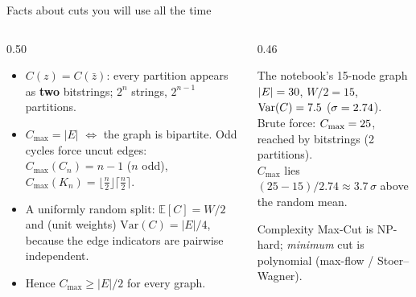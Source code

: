 \documentclass[aspectratio=169,11pt]{beamer}
\newcommand{\key}[1]{{\color{qdark}\textbf{#1}}}
\begin{document}
\begin{frame}{Facts about cuts you will use all the time}
  \begin{columns}[T]
    \begin{column}{0.50\textwidth}
      \begin{itemize}
        \item $C(z) = C(\bar z)$: every partition appears as \key{two} bitstrings; $2^n$ strings, $2^{n-1}$ partitions.
        \item $C_{\max} = |E|$ $\iff$ the graph is bipartite. Odd cycles force uncut edges:\\
          $C_{\max}(C_n) = n - 1$ ($n$ odd), $C_{\max}(K_n) = \lfloor\frac n2\rfloor\lceil\frac n2\rceil$.
        \item A uniformly random split: $\mathbb E[C] = W/2$ and (unit weights) $\mathrm{Var}(C) = |E|/4$, because
          the edge indicators are pairwise independent.
        \item Hence $C_{\max} \ge |E|/2$ for every graph.
      \end{itemize}
    \end{column}
    \begin{column}{0.46\textwidth}
      \begin{block}{The notebook's 15-node graph}
        \small
        $|E| = 30$, $W/2 = 15$, $\mathrm{Var}(C) = 7.5$ ($\sigma = 2.74$).\\
        Brute force: $C_{\max} = 25$, reached by \numnopt{} bitstrings (2 partitions).\\[1mm]
        $C_{\max}$ lies $(25 - 15)/2.74 \approx 3.7\,\sigma$ above the random mean.
      \end{block}
      \begin{alertblock}{Complexity}
        \small Max-Cut is NP-hard; \emph{minimum} cut is polynomial (max-flow / Stoer--Wagner).
      \end{alertblock}
    \end{column}
  \end{columns}
\end{frame}
\end{document}

